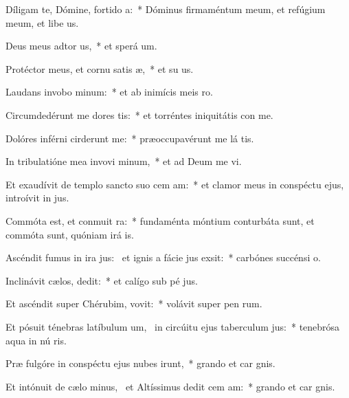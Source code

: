 \item Díligam te, Dómine, fortido a:~* Dóminus firmaméntum meum, et refúgium meum, et libe us.
\item Deus meus adtor us,~* et sperá  um.
\item Protéctor meus, et cornu satis æ,~* et su us.
\item Laudans invobo minum:~* et ab inimícis meis  ro.
\item Circumdedérunt me dores tis:~* et torréntes iniquitátis con me.
\item Dolóres inférni cirderunt me:~* præoccupavérunt me lá tis.
\item In tribulatióne mea invovi minum,~* et ad Deum me vi.
\item Et exaudívit de templo sancto suo cem am:~* et clamor meus in conspéctu ejus, introívit in  jus.
\item Commóta est, et conmuit ra:~* fundaménta móntium conturbáta sunt, et commóta sunt, quóniam irá  is.
\item Ascéndit fumus in ira jus:~\pscross{} et ignis a fácie jus exsit:~* carbónes succénsi   o.
\item Inclinávit cælos,  dedit:~* et calígo sub pé jus.
\item Et ascéndit super Chérubim,  vovit:~* volávit super pen rum.
\item Et pósuit ténebras latíbulum um,~\pscross{} in circúitu ejus taberculum jus:~* tenebrósa aqua in nú ris.
\item Præ fulgóre in conspéctu ejus nubes irunt,~* grando et car gnis.
\item Et intónuit de cælo minus,~\pscross{} et Altíssimus dedit cem am:~* grando et car gnis.
